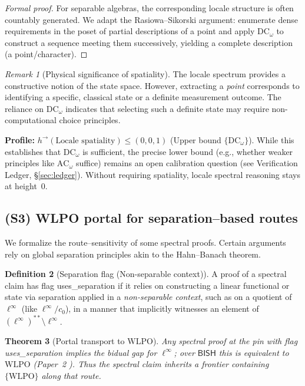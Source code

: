 \documentclass[11pt]{article}
\theoremstyle{plain}
\newtheorem{theorem}{Theorem}[section]
\theoremstyle{definition}
\newtheorem{definition}[theorem]{Definition}
\theoremstyle{remark}
\newtheorem{remark}[theorem]{Remark}
\newcommand{\linf}{\ell^\infty}
\newcommand{\BISH}{\mathsf{BISH}}
\newcommand{\WLPO}{\mathrm{WLPO}}
\newcommand{\DCw}{\mathrm{DC}_\omega}
\newcommand{\ACw}{\mathrm{AC}_\omega}
\begin{document}
\begin{proof}[Formal proof]
For separable algebras, the corresponding locale structure is often countably generated. We adapt the Rasiowa--Sikorski argument: enumerate dense requirements in the poset of partial descriptions of a point and apply $\DCw$ to construct a sequence meeting them successively, yielding a complete description (a point/character).
\end{proof}

\begin{remark}[Physical significance of spatiality]
The locale spectrum provides a constructive notion of the state space. However, extracting a \emph{point} corresponds to identifying a specific, classical state or a definite measurement outcome. The reliance on $\DCw$ indicates that selecting such a definite state may require non-computational choice principles.
\end{remark}

\noindent\textbf{Profile:} $h^{\to}(\text{Locale spatiality})\le (0,0,1)$ (Upper bound $\{\DCw\}$). While this establishes that $\DCw$ is sufficient, the precise lower bound (e.g., whether weaker principles like $\ACw$ suffice) remains an open calibration question (see Verification Ledger, \S\ref{sec:ledger}). Without requiring spatiality, locale spectral reasoning stays at height~0.

\subsection{(S3) WLPO portal for separation--based routes}
We formalize the route--sensitivity of some spectral proofs. Certain arguments rely on global separation principles akin to the Hahn--Banach theorem.

\begin{definition}[Separation flag (Non-separable context)]
A proof of a spectral claim has flag \textsf{uses\_separation} if it relies on constructing a linear functional or state via separation applied in a \emph{non-separable context}, such as on a quotient of $\linf$ (like $\linf/c_0$), in a manner that implicitly witnesses an element of $(\linf)^{**}\setminus \linf$.
\end{definition}

\begin{theorem}[Portal transport to $\WLPO$]
Any spectral proof at the pin with flag \textsf{uses\_separation} implies the bidual gap for $\linf$; over $\BISH$ this is equivalent to $\WLPO$ (Paper~2 \cite{Paper2}). Thus the spectral claim inherits a frontier containing $\{\WLPO\}$ along that route.
\end{theorem}
\end{document}
